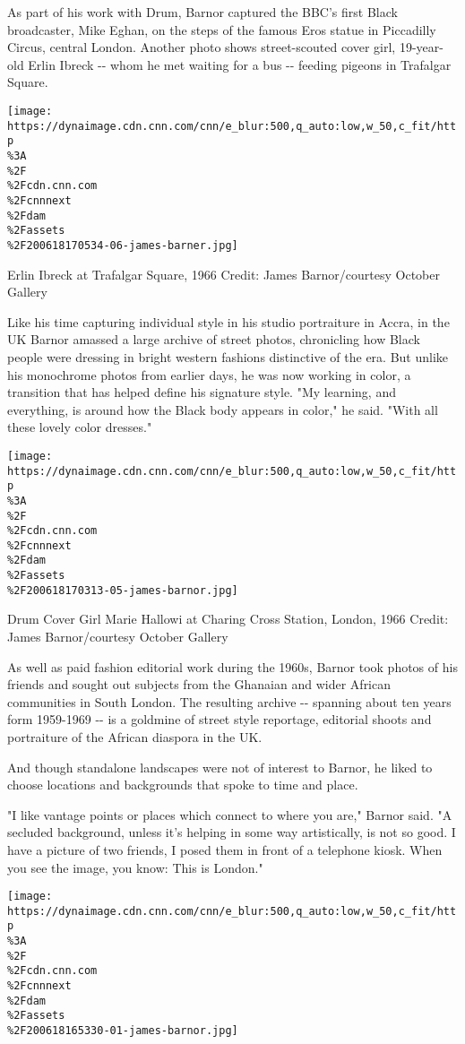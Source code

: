 As part of his work with Drum, Barnor captured the BBC's first Black
broadcaster, Mike Eghan, on the steps of the famous Eros statue in
Piccadilly Circus, central London. Another photo shows street-scouted
cover girl, 19-year-old Erlin Ibreck -\/- whom he met waiting for a bus
-\/- feeding pigeons in Trafalgar Square.

\texttt{[image: https://dynaimage.cdn.cnn.com/cnn/e\_blur:500,q\_auto:low,w\_50,c\_fit/http\\\%3A\\\%2F\\\%2Fcdn.cnn.com\\\%2Fcnnnext\\\%2Fdam\\\%2Fassets\\\%2F200618170534-06-james-barner.jpg]}

Erlin Ibreck at Trafalgar Square, 1966 Credit: James Barnor/courtesy
October Gallery

Like his time capturing individual style in his studio portraiture in
Accra, in the UK Barnor amassed a large archive of street photos,
chronicling how Black people were dressing in bright western fashions
distinctive of the era. But unlike his monochrome photos from earlier
days, he was now working in color, a transition that has helped define
his signature style. "My learning, and everything, is around how the
Black body appears in color," he said. "With all these lovely color
dresses."

\texttt{[image: https://dynaimage.cdn.cnn.com/cnn/e\_blur:500,q\_auto:low,w\_50,c\_fit/http\\\%3A\\\%2F\\\%2Fcdn.cnn.com\\\%2Fcnnnext\\\%2Fdam\\\%2Fassets\\\%2F200618170313-05-james-barnor.jpg]}

Drum Cover Girl Marie Hallowi at Charing Cross Station, London, 1966
Credit: James Barnor/courtesy October Gallery

As well as paid fashion editorial work during the 1960s, Barnor took
photos of his friends and sought out subjects from the Ghanaian and
wider African communities in South London. The resulting archive -\/-
spanning about ten years form 1959-1969 -\/- is a goldmine of street
style reportage, editorial shoots and portraiture of the African
diaspora in the UK.

And though standalone landscapes were not of interest to Barnor, he
liked to choose locations and backgrounds that spoke to time and place.

"I like vantage points or places which connect to where you are," Barnor
said. "A secluded background, unless it's helping in some way
artistically, is not so good. I have a picture of two friends, I posed
them in front of a telephone kiosk. When you see the image, you know:
This is London."

\texttt{[image: https://dynaimage.cdn.cnn.com/cnn/e\_blur:500,q\_auto:low,w\_50,c\_fit/http\\\%3A\\\%2F\\\%2Fcdn.cnn.com\\\%2Fcnnnext\\\%2Fdam\\\%2Fassets\\\%2F200618165330-01-james-barnor.jpg]}

